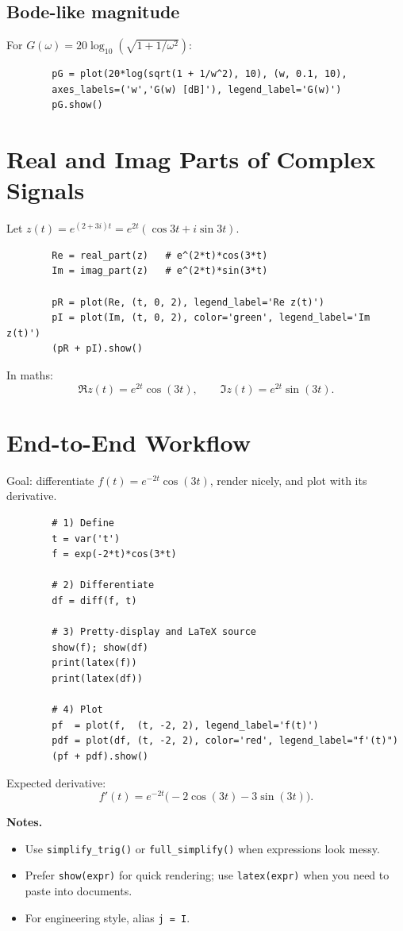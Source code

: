\documentclass[11pt,a4paper]{article}
\begin{document}
	\subsection*{Bode-like magnitude}
	For $G(\omega)=20\log_{10}(\sqrt{1+1/\omega^2})$:
	\begin{verbatim}
		pG = plot(20*log(sqrt(1 + 1/w^2), 10), (w, 0.1, 10),
		axes_labels=('w','G(w) [dB]'), legend_label='G(w)')
		pG.show()
	\end{verbatim}
	
	\section{Real and Imag Parts of Complex Signals}
	Let $z(t)=e^{(2+3i)t}=e^{2t}(\cos 3t + i\sin 3t)$.  
	\begin{verbatim}
		Re = real_part(z)   # e^(2*t)*cos(3*t)
		Im = imag_part(z)   # e^(2*t)*sin(3*t)
		
		pR = plot(Re, (t, 0, 2), legend_label='Re z(t)')
		pI = plot(Im, (t, 0, 2), color='green', legend_label='Im z(t)')
		(pR + pI).show()
	\end{verbatim}
	In maths:
	$$
	\Re z(t)=e^{2t}\cos(3t),\qquad \Im z(t)=e^{2t}\sin(3t).
	$$
	
	\section{End-to-End Workflow}
	Goal: differentiate $f(t)=e^{-2t}\cos(3t)$, render nicely, and plot with its derivative.
	\begin{verbatim}
		# 1) Define
		t = var('t')
		f = exp(-2*t)*cos(3*t)
		
		# 2) Differentiate
		df = diff(f, t)
		
		# 3) Pretty-display and LaTeX source
		show(f); show(df)
		print(latex(f))
		print(latex(df))
		
		# 4) Plot
		pf  = plot(f,  (t, -2, 2), legend_label='f(t)')
		pdf = plot(df, (t, -2, 2), color='red', legend_label="f'(t)")
		(pf + pdf).show()
	\end{verbatim}
	
	Expected derivative:
	$$
	f'(t)=e^{-2t}\big(-2\cos(3t)-3\sin(3t)\big).
	$$
	
	\bigskip
	\noindent\textbf{Notes.}
	\begin{itemize}
		\item Use \verb|simplify_trig()| or \verb|full_simplify()| when expressions look messy.
		\item Prefer \verb|show(expr)| for quick rendering; use \verb|latex(expr)| when you need to paste into documents.
		\item For engineering style, alias \verb|j = I|.
	\end{itemize}
	
\end{document}
